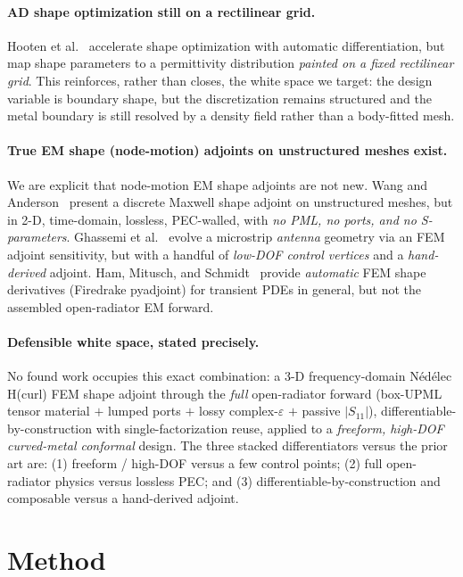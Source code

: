 \documentclass{anvil-paper}
\begin{document}
\paragraph{AD shape optimization still on a rectilinear grid.}
Hooten et al.~\cite{hooten2025} accelerate shape optimization with automatic
differentiation, but map shape parameters to a permittivity distribution
\emph{painted on a fixed rectilinear grid}. This reinforces, rather than closes,
the white space we target: the design variable is boundary shape, but the
discretization remains structured and the metal boundary is still resolved by a
density field rather than a body-fitted mesh.

\paragraph{True EM shape (node-motion) adjoints on unstructured meshes exist.}
We are explicit that node-motion EM shape adjoints are not new. Wang and
Anderson~\cite{wang2011} present a discrete Maxwell shape adjoint on
unstructured meshes, but in 2-D, time-domain, lossless, PEC-walled, with
\emph{no PML, no ports, and no S-parameters}. Ghassemi et
al.~\cite{ghassemi2013} evolve a microstrip \emph{antenna} geometry via an FEM
adjoint sensitivity, but with a handful of \emph{low-DOF control vertices} and a
\emph{hand-derived} adjoint. Ham, Mitusch, and Schmidt~\cite{ham2020} provide
\emph{automatic} FEM shape derivatives (Firedrake pyadjoint) for transient PDEs
in general, but not the assembled open-radiator EM forward.

\paragraph{Defensible white space, stated precisely.}
No found work occupies this exact combination: a 3-D frequency-domain N\'ed\'elec
H(curl) FEM shape adjoint through the \emph{full} open-radiator forward
(box-UPML tensor material $+$ lumped ports $+$ lossy complex-$\varepsilon$ $+$
passive $|S_{11}|$), differentiable-by-construction with single-factorization
reuse, applied to a \emph{freeform, high-DOF curved-metal conformal} design. The
three stacked differentiators versus the prior art are: (1) freeform / high-DOF
versus a few control points; (2) full open-radiator physics versus lossless
PEC; and (3) differentiable-by-construction and composable versus a hand-derived
adjoint.

\section{Method}
\label{sec:method}
\end{document}
